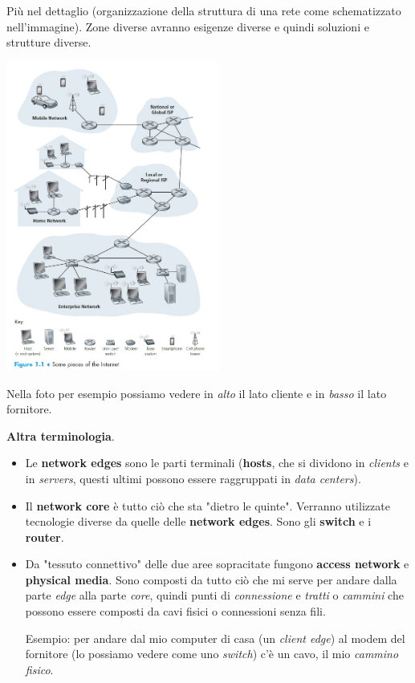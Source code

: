 \documentclass[10pt, a4paper, openany]{book}
\begin{document}
\vspace{0.5cm}
\noindent Più nel dettaglio (organizzazione della struttura di una rete come schematizzato nell'immagine). Zone diverse avranno esigenze diverse e quindi soluzioni e strutture diverse.
\begin{center}
    \includegraphics[width=70mm,scale=0.5]{cap1 - Introduzione alle reti - 0.jpg}    
\end{center}
\noindent Nella foto per esempio possiamo vedere in \textit{alto} il lato cliente e in \textit{basso} il lato fornitore.

\vspace{0.5cm}
\noindent \textbf{Altra terminologia}.
\begin{itemize}
    \item Le \textbf{network edges} sono le parti terminali (\textbf{hosts}, che si dividono in \textit{clients} e in \textit{servers}, questi ultimi possono essere raggruppati in \textit{data centers}).
    \item Il \textbf{network core} è tutto ciò che sta "dietro le quinte". Verranno utilizzate tecnologie diverse da quelle delle \textbf{network edges}. Sono gli \textbf{switch} e i \textbf{router}.
    \item Da "tessuto connettivo" delle due aree sopracitate fungono \textbf{access network} e \textbf{physical media}. Sono composti da tutto ciò che mi serve per andare dalla parte \textit{edge} alla parte \textit{core}, quindi punti di \textit{connessione} e \textit{tratti} o \textit{cammini} che possono essere composti da cavi fisici o connessioni senza fili.

    \noindent Esempio: per andare dal mio computer di casa (un \textit{client edge}) al modem del fornitore (lo possiamo vedere come uno \textit{switch}) c'è un cavo, il mio \textit{cammino fisico}.
\end{itemize}
\end{document}
